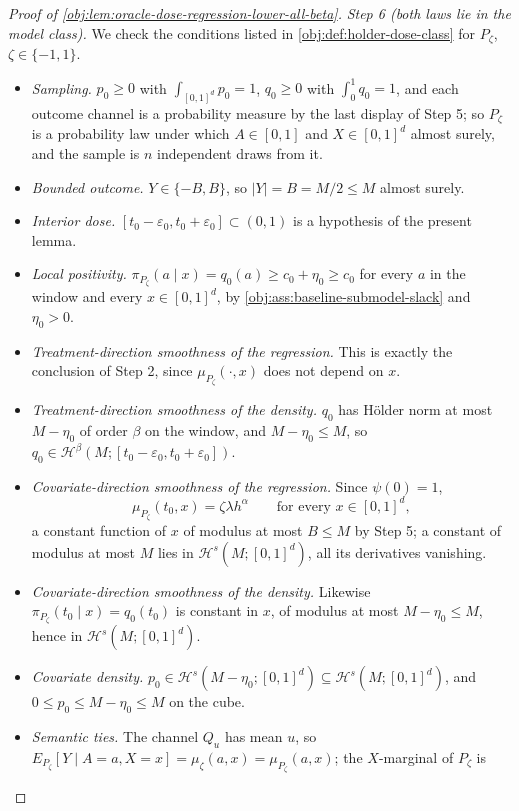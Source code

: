 \documentclass[11pt]{article}
\begin{document}
\begin{proof}[Proof of \cref{obj:lem:oracle-dose-regression-lower-all-beta}]
\emph{Step 6 (both laws lie in the model class).} We check the conditions listed in
\cref{obj:def:holder-dose-class} for \(P_\zeta\), \(\zeta\in\{-1,1\}\).
\begin{itemize}
\item \emph{Sampling.} \(p_0\ge0\) with \(\int_{[0,1]^d}p_0=1\), \(q_0\ge0\) with
\(\int_0^1q_0=1\), and each outcome channel is a probability measure by the last display of Step 5;
so \(P_\zeta\) is a probability law under which \(A\in[0,1]\) and \(X\in[0,1]^d\) almost surely, and
the sample is \(n\) independent draws from it.
\item \emph{Bounded outcome.} \(Y\in\{-B,B\}\), so \(|Y|=B=M/2\le M\) almost surely.
\item \emph{Interior dose.} \([t_0-\varepsilon_0,t_0+\varepsilon_0]\subset(0,1)\) is a hypothesis of
the present lemma.
\item \emph{Local positivity.} \(\pi_{P_\zeta}(a\mid x)=q_0(a)\ge c_0+\eta_0\ge c_0\) for every
\(a\) in the window and every \(x\in[0,1]^d\), by \cref{obj:ass:baseline-submodel-slack} and
\(\eta_0>0\).
\item \emph{Treatment-direction smoothness of the regression.} This is exactly the conclusion of
Step 2, since \(\mu_{P_\zeta}(\cdot,x)\) does not depend on \(x\).
\item \emph{Treatment-direction smoothness of the density.} \(q_0\) has Hölder norm at most
\(M-\eta_0\) of order \(\beta\) on the window, and \(M-\eta_0\le M\), so
\(q_0\in\mathcal H^{\beta}(M;[t_0-\varepsilon_0,t_0+\varepsilon_0])\).
\item \emph{Covariate-direction smoothness of the regression.} Since \(\psi(0)=1\),
\[
\mu_{P_\zeta}(t_0,x)=\zeta\lambda h^{\alpha}
\qquad\text{for every }x\in[0,1]^d ,
\]
a constant function of \(x\) of modulus at most \(B\le M\) by Step 5; a constant of modulus at most
\(M\) lies in \(\mathcal H^{s}(M;[0,1]^d)\), all its derivatives vanishing.
\item \emph{Covariate-direction smoothness of the density.} Likewise
\(\pi_{P_\zeta}(t_0\mid x)=q_0(t_0)\) is constant in \(x\), of modulus at most \(M-\eta_0\le M\),
hence in \(\mathcal H^{s}(M;[0,1]^d)\).
\item \emph{Covariate density.} \(p_0\in\mathcal H^{s}(M-\eta_0;[0,1]^d)\subseteq
\mathcal H^{s}(M;[0,1]^d)\), and \(0\le p_0\le M-\eta_0\le M\) on the cube.
\item \emph{Semantic ties.} The channel \(Q_u\) has mean \(u\), so
\(E_{P_\zeta}[Y\mid A=a,X=x]=\mu_\zeta(a,x)=\mu_{P_\zeta}(a,x)\); the \(X\)-marginal of \(P_\zeta\) is

\end{itemize}
\end{proof}
\end{document}
